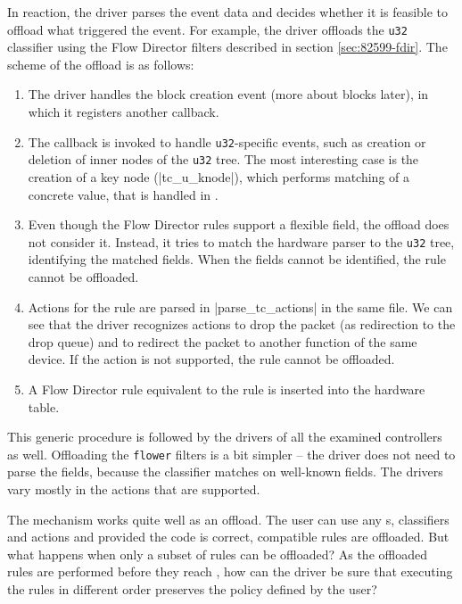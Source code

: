 In reaction, the driver parses the event data and decides whether it is feasible to
offload what triggered the event. For example, the  driver offloads the
\texttt{u32} classifier using the Flow Director filters described in section
\ref{sec:82599-fdir}. The scheme of the offload is as follows:

\begin{enumerate}
	\item The driver handles the block creation event (more about blocks
		later), in which it registers another callback.

	\item The callback is invoked to handle \texttt{u32}-specific events, such
		as creation or deletion of inner nodes of the \texttt{u32} tree. The
		most interesting case is the creation of a key node (\struct|tc_u_knode|),
		which performs matching of a concrete value, that is handled in
		.

	\item Even though the Flow Director rules support a flexible field, the
		offload does not consider it. Instead, it tries to match the hardware parser to
		the \texttt{u32} tree, identifying the matched fields. When the fields
		cannot be identified, the rule cannot be offloaded.

	\item Actions for the rule are parsed in \fnc|parse_tc_actions| in
		the same file. We can see that the driver recognizes actions to drop
		the packet (as redirection to the drop queue) and to redirect the
		packet to another function of the same device. If the action is not
		supported, the rule cannot be offloaded.

	\item A Flow Director rule equivalent to the  rule is inserted into
		the hardware table.
\end{enumerate}

This generic procedure is followed by the drivers of all the examined controllers
as well. Offloading the \texttt{flower} filters is a bit simpler -- the driver does not
need to parse the fields, because the classifier matches on well-known fields.
The drivers vary mostly in the actions that are supported.

The mechanism works quite well as an offload. The user can use any \qdisc{}s,
classifiers and actions and provided the code is correct, compatible rules
are offloaded. But what happens when only a subset of rules can be offloaded?
As the offloaded rules are performed before they reach , how can the driver
be sure that executing the rules in different order preserves the policy
defined by the user?


